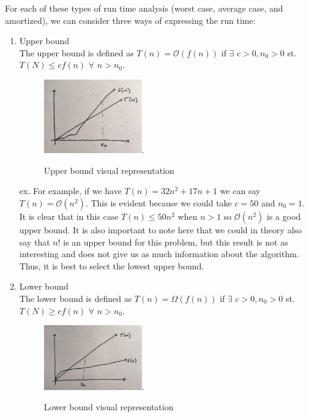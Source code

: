 \vspace{3mm}

For each of these types of run time analysis (worst case, average case, and amortized), we can consider three ways of expressing the run time:
\begin{enumerate}
    \item Upper bound \\
    
    The upper bound is defined as $T(n) = \mathcal{O}(f(n))$ if $\exists$  $c > 0, n_0>0$ st. $T(N) \leq cf(n)$  $\forall$  $n>n_0$. \\

\begin{figure}[h!]
  \begin{center}
    \includegraphics[width=0.4\textwidth]{figures/IMG_8828.jpg}.
    \caption{
      Upper bound visual representation}
    \label{fig:example_figure}
  \end{center}
\end{figure}
    
    ex. For example, if we have $T(n)=32n^2+17n+1$ we can say $T(n) = \mathcal{O}(n^2)$. This is evident because we could take $c=50$ and $n_0 = 1$. It is clear that in this case $T(n) \leq 50n^2$ when $n>1$ so $\mathcal{O}(n^2)$ is a good upper bound. It is also important to note here that we could in theory also say that $n!$ is an upper bound for this problem, but this result is not as interesting and does not give us as much information about the algorithm. Thus, it is best to select the lowest upper bound.
    
    \item Lower bound \\
    
    The lower bound is defined as $T(n) = \Omega(f(n))$ if $\exists$  $c > 0, n_0>0$ st. $T(N) \geq cf(n)$  $\forall$  $n>n_0$. \\
    
    \begin{figure}[h!]
  \begin{center}
    \includegraphics[width=0.4\textwidth]{figures/IMG_8827.jpg}.
    \caption{
      Lower bound visual representation}
    \label{fig:example_figure}
  \end{center}
\end{figure}
    

\end{enumerate}
